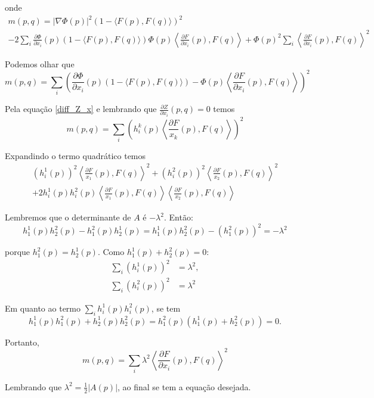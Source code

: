 \begin{demonstracao}
	onde
	\begin{multline*}
		m(p,q) = |\nabla \Phi(p)|^2 (1 - \langle F(p), F(q) \rangle)^2 \\
		- 2 \sum_i \frac{\partial \Phi}{\partial x_i}(p) (1 - \langle F(p), F(q) \rangle) \Phi(p) \left\langle \frac{\partial F}{\partial x_i}(p), F(q) \right\rangle + \Phi(p)^2 \sum_i \left\langle \frac{\partial F}{\partial x_i} (p), F(q) \right\rangle^2
	\end{multline*}
	
	Podemos olhar que
	\begin{equation*}
		m(p,q) = \sum_i \left(  \frac{\partial \Phi}{\partial x_i}(p)(1 - \langle F(p),F(q) \rangle) - \Phi(p) \left\langle \frac{\partial F}{\partial x_i}(p), F(q) \right\rangle \right)^2
	\end{equation*}
	
	Pela equação \ref{diff_Z_x} e lembrando que $\frac{\partial Z}{\partial x_i}(p,q)=0$ temos
	\begin{equation*}
		m(p,q) = \sum_i \left( h_i^k(p) \left\langle \frac{\partial F}{x_k}(p), F(q) \right\rangle \right)^2
	\end{equation*}
	
	Expandindo o termo quadrático temos
	\begin{multline*}
		(h_i^1(p))^2 \left\langle \frac{\partial F}{x_1}(p), F(q) \right\rangle^2 + (h_i^2(p))^2 \left\langle \frac{\partial F}{x_2}(p), F(q) \right\rangle^2\\
		+ 2 h_i^1(p) h_i^2(p) \left\langle \frac{\partial F}{x_1}(p), F(q) \right\rangle \left\langle \frac{\partial F}{x_2}(p), F(q) \right\rangle
	\end{multline*}
	
	Lembremos que o determinante de $A$ é $-\lambda^2$. Então:
	\begin{equation*}
		h_1^1(p) h_2^2(p) - h_1^2(p) h_2^1(p) = h_1^1(p) h_2^2(p) - (h_1^2(p))^2 = -\lambda^2
	\end{equation*}
	
	porque $h_1^2(p) = h_2^1(p)$. Como $h_1^1(p) + h_2^2(p) = 0$:
	\begin{align*}
		\sum_i (h_i^1(p))^2 &= \lambda^2,\\
		\sum_i (h_i^2(p))^2 &= \lambda^2
	\end{align*}
	
	Em quanto ao termo $\sum_i h_i^1(p) h_i^2(p)$, se tem
	\begin{equation*}
		h_1^1(p) h_1^2(p) + h_2^1(p) h_2^2(p) = h_1^2(p) (h_1^1(p) + h_2^2(p)) = 0.
	\end{equation*}
	
	Portanto,
	\begin{equation*}
		m(p,q) = \sum_i \lambda^2 \left\langle \frac{\partial F}{\partial x_i}(p), F(q) \right\rangle^2
	\end{equation*}
	
	Lembrando que $\lambda^2 = \frac{1}{2} |A(p)|$, ao final se tem a equação desejada.
\end{demonstracao}

